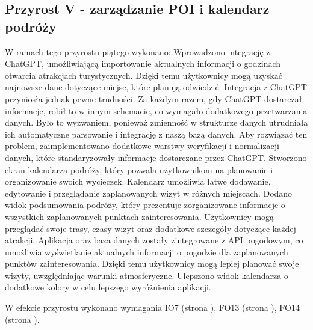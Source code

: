    \subsection{Przyrost V - zarządzanie POI i kalendarz podróży}
    \label{sec:przyrost5}

    W ramach tego przyrostu piątego wykonano:
    Wprowadzono integrację z ChatGPT, umożliwiającą importowanie aktualnych informacji o godzinach otwarcia atrakcjach turystycznych. 
    Dzięki temu użytkownicy mogą uzyskać najnowsze dane dotyczące miejsc, które planują odwiedzić.\newline
    \indent Integracja z ChatGPT przyniosła jednak pewne trudności. Za każdym razem, gdy ChatGPT dostarczał informacje, robił to w innym schemacie, 
    co wymagało dodatkowego przetwarzania danych. Było to wyzwaniem, ponieważ zmienność w strukturze danych utrudniała ich automatyczne parsowanie i integrację z naszą bazą danych. \newline 
    \indent Aby rozwiązać ten problem, zaimplementowano dodatkowe warstwy weryfikacji i normalizacji danych, które standaryzowały informacje dostarczane przez ChatGPT.\newline
    \indent Stworzono ekran kalendarza podróży, który pozwala użytkownikom na planowanie i organizowanie swoich wycieczek.
    Kalendarz umożliwia łatwe dodawanie, edytowanie i przeglądanie zaplanowanych wizyt w różnych miejscach.\newline
    \indent Dodano widok podsumowania podróży, który prezentuje zorganizowane informacje o wszystkich zaplanowanych punktach zainteresowania. 
    Użytkownicy mogą przeglądać swoje trasy, czasy wizyt oraz dodatkowe szczegóły dotyczące każdej atrakcji. \newline
    \indent Aplikacja oraz baza danych zostały zintegrowane z API pogodowym, co umożliwia wyświetlanie aktualnych informacji o pogodzie dla zaplanowanych punktów zainteresowania. 
    Dzięki temu użytkownicy mogą lepiej planować swoje wizyty, uwzględniając warunki atmosferyczne. \newline
    Ulepszono widok kalendarza o dodatkowe kolory w celu lepszego wyróżnienia aplikacji. 

    W efekcie przyrostu wykonano wymagania IO7 (strona \pageref{tab:requirements:env7}), FO13 (strona \pageref{tab:requirements:func13}), FO14 (strona \pageref{tab:requirements:func14}).

